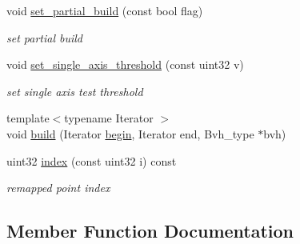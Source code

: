 \begin{DoxyCompactItemize}
\mbox{\label{classcugar_1_1deprecated_1_1_bvh__sah__builder_abe5a365a98236865d987fb144b65723f}} 
void \hyperlink{classcugar_1_1deprecated_1_1_bvh__sah__builder_abe5a365a98236865d987fb144b65723f}{set\+\_\+partial\+\_\+build} (const bool flag)
\begin{DoxyCompactList}\small\item\em set partial build \end{DoxyCompactList}\item 
\mbox{\label{classcugar_1_1deprecated_1_1_bvh__sah__builder_ae57d3b98374b68b877bb495e65a90d5b}} 
void \hyperlink{classcugar_1_1deprecated_1_1_bvh__sah__builder_ae57d3b98374b68b877bb495e65a90d5b}{set\+\_\+single\+\_\+axis\+\_\+threshold} (const uint32 v)
\begin{DoxyCompactList}\small\item\em set single axis test threshold \end{DoxyCompactList}\item 
{\footnotesize template$<$typename Iterator $>$ }\\void \hyperlink{classcugar_1_1deprecated_1_1_bvh__sah__builder_ac6e60f83f5b49e6a2b169e1e8d2a5a35}{build} (Iterator \hyperlink{namespacecugar_a2121df08f967e232ea5fe0ee378dee67}{begin}, Iterator end, Bvh\+\_\+type $\ast$bvh)
\item 
\mbox{\label{classcugar_1_1deprecated_1_1_bvh__sah__builder_a260f4eeafd2786157beb37a3bb3734af}} 
uint32 \hyperlink{classcugar_1_1deprecated_1_1_bvh__sah__builder_a260f4eeafd2786157beb37a3bb3734af}{index} (const uint32 i) const
\begin{DoxyCompactList}\small\item\em remapped point index \end{DoxyCompactList}\end{DoxyCompactItemize}


\subsection{Member Function Documentation}
\mbox{\label{classcugar_1_1deprecated_1_1_bvh__sah__builder_ac6e60f83f5b49e6a2b169e1e8d2a5a35}} 
